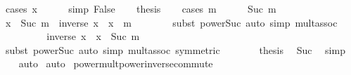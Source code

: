 \begin{isabellebody}
%
\isadelimproof
%
\endisadelimproof
%
\isatagproof
{}\isamarkupfalse%
\ {\isacharparenleft}{\kern0pt}cases\ {\isachardoublequoteopen}x\ {\isacharequal}{\kern0pt}\ {}{\isachardoublequoteclose}{\isacharparenright}{\kern0pt}\isanewline
\ \ \isamarkupfalse%
\ {\isacharbrackleft}{\kern0pt}simp{\isacharbrackright}{\kern0pt}{\isacharcolon}{\kern0pt}\ False\isanewline
\ \ \isamarkupfalse%
\ {\isacharquery}{\kern0pt}thesis\isanewline
\ \ \isamarkupfalse%
\ {\isacharparenleft}{\kern0pt}cases\ m{\isacharparenright}{\kern0pt}\isanewline
\ \ \ \ \isamarkupfalse%
\ {\isacharparenleft}{\kern0pt}Suc\ m{\isacharprime}{\kern0pt}{\isacharparenright}{\kern0pt}\isanewline
\ \ \ \ \isamarkupfalse%
\ {\isachardoublequoteopen}x\ {\isacharcircum}{\kern0pt}\ Suc\ m{\isacharprime}{\kern0pt}\ {\isacharasterisk}{\kern0pt}\ inverse\ x\ {\isacharequal}{\kern0pt}\ x\ {\isacharcircum}{\kern0pt}\ m{\isacharprime}{\kern0pt}{\isachardoublequoteclose}\isanewline
\ \ \ \ \ \ \isamarkupfalse%
\ {\isacharparenleft}{\kern0pt}subst\ power{\isacharunderscore}{\kern0pt}Suc{}{\isacharparenright}{\kern0pt}\ {\isacharparenleft}{\kern0pt}auto\ simp{\isacharcolon}{\kern0pt}\ mult{\isachardot}{\kern0pt}assoc{\isacharparenright}{\kern0pt}\isanewline
\ \ \ \ \isamarkupfalse%
\ \isamarkupfalse%
\ {\isachardoublequoteopen}{\isasymdots}\ {\isacharequal}{\kern0pt}\ inverse\ x\ {\isacharasterisk}{\kern0pt}\ x\ {\isacharcircum}{\kern0pt}\ Suc\ m{\isacharprime}{\kern0pt}{\isachardoublequoteclose}\isanewline
\ \ \ \ \ \ \isamarkupfalse%
\ {\isacharparenleft}{\kern0pt}subst\ power{\isacharunderscore}{\kern0pt}Suc{\isacharparenright}{\kern0pt}\ {\isacharparenleft}{\kern0pt}auto\ simp{\isacharcolon}{\kern0pt}\ mult{\isachardot}{\kern0pt}assoc\ {\isacharbrackleft}{\kern0pt}symmetric{\isacharbrackright}{\kern0pt}{\isacharparenright}{\kern0pt}\isanewline
\ \ \ \ \isamarkupfalse%
\ \isamarkupfalse%
\ {\isacharquery}{\kern0pt}thesis\ \isamarkupfalse%
\ Suc\ \isamarkupfalse%
\ simp\isanewline
\ \ \isamarkupfalse%
\ auto\isanewline
{}\isamarkupfalse%
\ auto%
\endisatagproof
{\isafoldproof}%
%
\isadelimproof
\isanewline
%
\endisadelimproof
\isanewline
{}\isamarkupfalse%
\ power{\isacharunderscore}{\kern0pt}mult{\isacharunderscore}{\kern0pt}power{\isacharunderscore}{\kern0pt}inverse{\isacharunderscore}{\kern0pt}commute{\isacharcolon}{\kern0pt}\isanewline

\end{isabellebody}
